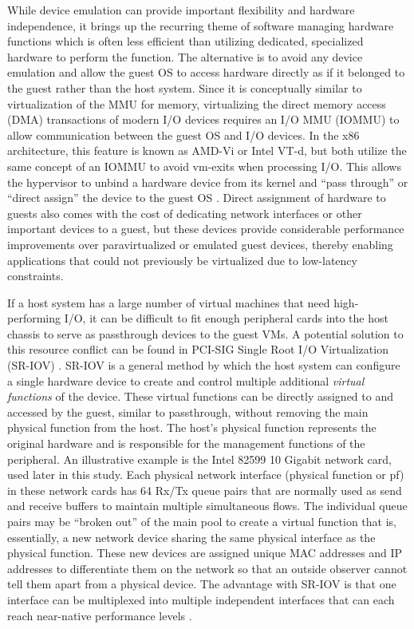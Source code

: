 While device emulation can provide important flexibility and hardware independence, it brings up the recurring theme of software managing hardware functions which is often less efficient than utilizing dedicated, specialized hardware to perform the function.
The alternative is to avoid any device emulation and allow the guest OS to access hardware directly as if it belonged to the guest rather than the host system.
Since it is conceptually similar to virtualization of the MMU for memory, virtualizing the direct memory access (DMA) transactions of modern I/O devices requires an I/O MMU (IOMMU) to allow communication between the guest OS and I/O devices.
In the x86 architecture, this feature is known as AMD-Vi or Intel VT-d, but both utilize the same concept of an IOMMU to avoid vm-exits when processing I/O.
This allows the hypervisor to unbind a hardware device from its kernel and ``pass through'' or ``direct assign'' the device to the guest OS \autocite{_jones_1}.
Direct assignment of hardware to guests also comes with the cost of dedicating network interfaces or other important devices to a guest, but these devices provide considerable performance improvements over paravirtualized or emulated guest devices, thereby enabling applications that could not previously be virtualized due to low-latency constraints.

If a host system has a large number of virtual machines that need high-performing I/O, it can be difficult to fit enough peripheral cards into the host chassis to serve as passthrough devices to the guest VMs.
A potential solution to this resource conflict can be found in PCI-SIG Single Root I/O Virtualization (SR-IOV) \autocite{_pcisig_1, intelvtd}.
SR-IOV is a general method by which the host system can configure a single hardware device to create and control multiple additional \emph{virtual functions} of the device.
These virtual functions can be directly assigned to and accessed by the guest, similar to passthrough, without removing the main physical function from the host.
The host's physical function represents the original hardware and is responsible for the management functions of the peripheral.  
An illustrative example is the Intel 82599 10 Gigabit network card, used later in this study.
Each physical network interface (physical function or pf) in these network cards has 64 Rx/Tx queue pairs that are normally used as send and receive buffers to maintain multiple simultaneous flows.
The individual queue pairs may be ``broken out'' of the main pool to create a virtual function that is, essentially, a new network device sharing the same physical interface as the physical function.
These new devices are assigned unique MAC addresses and IP addresses to differentiate them on the network so that an outside observer cannot tell them apart from a physical device.
The advantage with SR-IOV is that one interface can be multiplexed into multiple independent interfaces that can each reach near-native performance levels \autocite{_nasa_1}.

